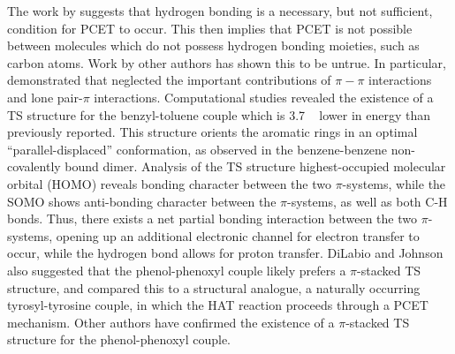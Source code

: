 The work by \citet{Mayer2002} suggests that hydrogen bonding is a necessary, but
not sufficient, condition for PCET to occur. This then implies that PCET is not
possible between molecules which do not possess hydrogen bonding moieties, such
as carbon atoms. Work by other authors has shown this to be
untrue.\cite{Hatcher2007, DiLabio2007} In particular, \citet{DiLabio2007}
demonstrated that \citet{Mayer2002} neglected the important contributions of
$\pi-\pi$ interactions and lone pair-$\pi$ interactions. Computational studies
revealed the existence of a TS structure for the benzyl-toluene couple which is
3.7 \kcalmol~ lower in energy than previously reported. This structure orients
the aromatic rings in an optimal ``parallel-displaced'' conformation, as
observed in the benzene-benzene non-covalently bound dimer.\cite{Sinnokrot2002}
Analysis of the TS structure highest-occupied molecular orbital (HOMO) reveals
bonding character between the two $\pi$-systems, while the SOMO shows
anti-bonding character between the $\pi$-systems, as well as both C-H bonds.
Thus, there exists a net partial bonding interaction between the two
$\pi$-systems, opening up an additional electronic channel for electron transfer
to occur, while the hydrogen bond allows for proton transfer. DiLabio and
Johnson also suggested that the phenol-phenoxyl couple likely prefers a
$\pi$-stacked TS structure, and compared this to a structural analogue, a
naturally occurring tyrosyl-tyrosine couple, in which the HAT reaction proceeds
through a PCET mechanism. Other authors have confirmed the existence of a
$\pi$-stacked TS structure for the phenol-phenoxyl couple.\cite{Sirjoosingh2011,
HammesSchiffer2015, MunozRugeles2017}

